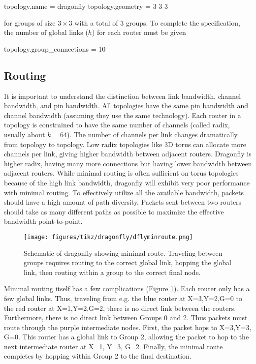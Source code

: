\begin{ViFile}
topology.name = dragonfly
topology.geometry = 3 3 3
\end{ViFile}
for groups of size $3 \times 3$ with a total of 3 groups.
To complete the specification, the number of global links ($h$) for each router must be given
\begin{ViFile}
topology.group_connections = 10
\end{ViFile}

\subsection{Routing}
It is important to understand the distinction between link bandwidth, channel bandwidth, and pin bandwidth.
All topologies have the same pin bandwidth and channel bandwidth (assuming they use the same technology).
Each router in a topology is constrained to have the same number of channels (called radix, usually about $k=64$).
The number of channels per link changes dramatically from topology to topology.
Low radix topologies like 3D torus can allocate more channels per link, 
giving higher bandwidth between adjacent routers.
Dragonfly is higher radix, having many more connections but having lower bandwidth between adjacent routers.
While minimal routing is often sufficient on torus topologies because of the high link bandwidth,
dragonfly will exhibit very poor performance with minimal routing.
To effectively utilize all the available bandwidth, packets should have a high amount of path diversity.
Packets sent between two routers should take as many different paths as possible to maximize the effective bandwidth point-to-point.

\begin{figure}[h!]
\centering
\texttt{[image: figures/tikz/dragonfly/dflyminroute.png]}
\caption{Schematic of dragonfly showing minimal route. Traveling between groups requires routing to the correct global link, hopping the global link, then routing within a group to the correct final node.}
\label{fig:topologies:dflyminroute}
\end{figure}

Minimal routing itself has a few complications (Figure \ref{fig:topologies:dflyminroute}).  
Each router only has a few global links.  
Thus, traveling from e.g. the blue router at X=3,Y=2,G=0 to the red router at X=1,Y=2,G=2, there is no direct link between the routers.
Furthermore, there is no direct link between Groups 0 and 2.
Thus packets must route through the purple intermediate nodes.
First, the packet hops to X=3,Y=3, G=0.  
This router has a global link to Group 2, allowing the packet to hop to the next intermediate router at X=1, Y=3, G=2.
Finally, the minimal route completes by hopping within Group 2 to the final destination.


